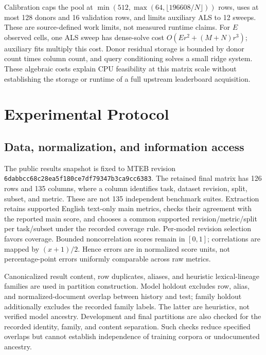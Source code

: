 \documentclass{article}
\begin{document}
Calibration caps the pool at $\min(512,\max(64,\lfloor196608/N\rfloor))$ rows, uses at most 128 donors and 16 validation rows, and limits auxiliary ALS to 12 sweeps. These are source-defined work limits, not measured runtime claims. For $E$ observed cells, one ALS sweep has dense-solve cost $O(Er^2+(M+N)r^3)$; auxiliary fits multiply this cost. Donor residual storage is bounded by donor count times column count, and query conditioning solves a small ridge system. These algebraic costs explain CPU feasibility at this matrix scale without establishing the storage or runtime of a full upstream leaderboard acquisition.

\section{Experimental Protocol}
\subsection{Data, normalization, and information access}
The public results snapshot is fixed to MTEB revision
\texttt{6dabbcc68c28ea5f180ce7df79347b3ca9cc6383}.
The retained final matrix has 126 rows and 135 columns, where a column identifies task, dataset revision, split, subset, and metric. These are not 135 independent benchmark suites. Extraction retains supported English text-only main metrics, checks their agreement with the reported main score, and chooses a common supported revision/metric/split per task/subset under the recorded coverage rule. Per-model revision selection favors coverage. Bounded noncorrelation scores remain in $[0,1]$; correlations are mapped by $(x+1)/2$. Hence errors are in normalized score units, not percentage-point errors uniformly comparable across raw metrics.

Canonicalized result content, row duplicates, aliases, and heuristic lexical-lineage families are used in partition construction. Model holdout excludes row, alias, and normalized-document overlap between history and test; family holdout additionally excludes the recorded family labels. The latter are heuristics, not verified model ancestry. Development and final partitions are also checked for the recorded identity, family, and content separation. Such checks reduce specified overlaps but cannot establish independence of training corpora or undocumented ancestry.
\end{document}
